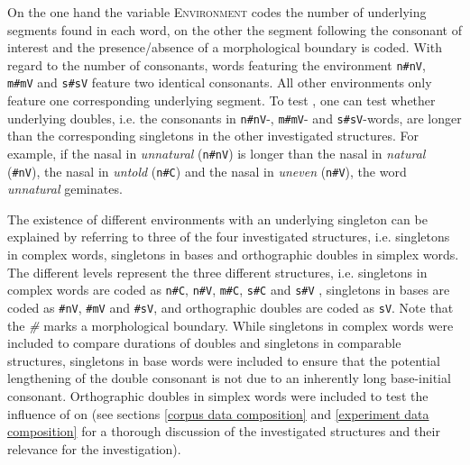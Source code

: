   
  On the one hand the variable \textsc{Environment} codes the number of underlying segments found in each word, on the other the segment following the consonant of interest and the presence/absence of a morphological boundary is coded.  With regard to the number of consonants,  words featuring the environment \texttt{n\#nV}, \texttt{ m\#mV} and \texttt{s\#sV} feature two identical consonants. All other environments only feature one corresponding underlying segment. 
  To test , one can test whether underlying doubles, i.e. the consonants in \texttt{n\#nV}-,  \texttt{m\#mV}- and \texttt{s\#sV}-words, are longer than the corresponding singletons in the other investigated structures. For example, if the nasal in \textit{unnatural} (\texttt{n\#nV}) is longer than the nasal in \textit{natural} (\texttt{\#nV}), the nasal in \textit{untold} (\texttt{n\#C}) and the nasal in \textit{uneven} (\texttt{n\#V}), the word \textit{unnatural} {geminates}.
  
  The existence of different environments with an underlying singleton can be explained by referring to three of the four investigated structures, i.e. singletons in complex words, singletons in bases and orthographic doubles in simplex words. The different levels represent the three different structures, i.e. singletons in complex words are coded as \texttt{n\#C}, \texttt{n\#V}, \texttt{m\#C}, \texttt{s\#C} and \texttt{s\#V} , singletons in bases are coded as \texttt{\#nV}, \texttt{\#mV} and \texttt{\#sV}, and orthographic doubles are coded as \texttt{sV}. Note that the \textit{\#} marks a morphological boundary.
  While singletons in complex words were included to compare durations of doubles and singletons in comparable structures, singletons in base words were included to ensure that the potential lengthening of the double consonant is not due to an inherently long base-initial consonant. Orthographic doubles in simplex words were included to test the influence of  on  (see sections \ref{corpus data composition} and \ref{experiment data composition} for a thorough discussion of the investigated structures and their relevance for the investigation).
  
  

